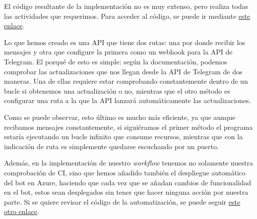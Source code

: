 El código resultante de la implementación no es muy extenso, pero realiza todas las 
actividades que requerimos. Para acceder al código, se puede ir mediante 
\href{https://github.com/jero-dev/proyecto-tfg/blob/main/src/bot/telegram/main.go}{este enlace}.

Lo que hemos creado es una API que tiene dos rutas: una por donde recibir los 
mensajes y otra que configure la primera como un webhook para la API de Telegram. 
El porqué de esto es simple: según la documentación, podemos comprobar las 
actualizaciones que nos llegan desde la API de Telegram de dos maneras. Una de 
ellas requiere estar comprobando constantemente dentro de un bucle si obtenemos 
una actualización o no, mientras que el otro método es configurar una ruta a la que 
la API lanzará automáticamente las actualizaciones.

Como se puede observar, esto último es mucho más eficiente, ya que aunque recibamos 
mensajes constantemente,  si siguiéramos el primer método el programa estaría 
ejecutando un bucle infinito que consume recursos, mientras que con la indicación 
de ruta es simplemente quedarse escuchando por un puerto.

Además, en la implementación de nuestro \textit{workflow} 
tenemos no solamente nuestra comprobación de CI, sino que hemos añadido también el 
despliegue automático del bot en Azure, haciendo que cada vez que se añadan cambios 
de funcionalidad en el bot, estos sean desplegados sin tener que hacer ninguna 
acción por nuestra parte. Si se quiere revisar el código de la automatización, se 
puede seguir 
\href{https://github.com/jero-dev/proyecto-tfg/blob/main/.github/workflows/bot-telegram-ci.yml}{este otro enlace}.
